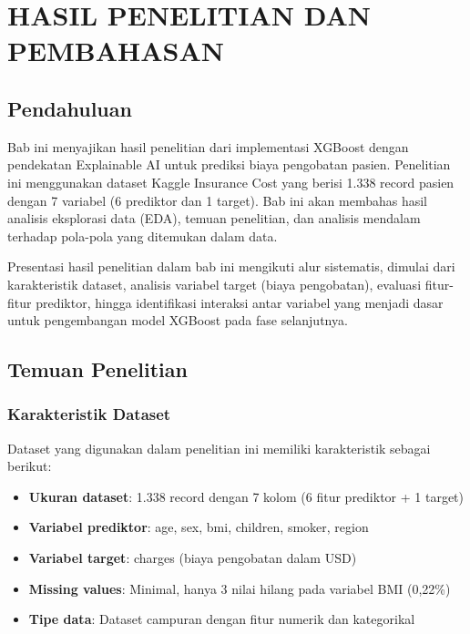 \chapter{HASIL PENELITIAN DAN PEMBAHASAN}
\label{chap:hasil}

\section{Pendahuluan}
\label{sec:pendahuluan-hasil}

Bab ini menyajikan hasil penelitian dari implementasi XGBoost dengan pendekatan Explainable AI untuk prediksi biaya pengobatan pasien. Penelitian ini menggunakan dataset Kaggle Insurance Cost yang berisi 1.338 record pasien dengan 7 variabel (6 prediktor dan 1 target). Bab ini akan membahas hasil analisis eksplorasi data (EDA), temuan penelitian, dan analisis mendalam terhadap pola-pola yang ditemukan dalam data.

Presentasi hasil penelitian dalam bab ini mengikuti alur sistematis, dimulai dari karakteristik dataset, analisis variabel target (biaya pengobatan), evaluasi fitur-fitur prediktor, hingga identifikasi interaksi antar variabel yang menjadi dasar untuk pengembangan model XGBoost pada fase selanjutnya.

\section{Temuan Penelitian}
\label{sec:temuan-penelitian}

\subsection{Karakteristik Dataset}
\label{subsec:karakteristik-dataset}

Dataset yang digunakan dalam penelitian ini memiliki karakteristik sebagai berikut:

\begin{itemize}
    \item \textbf{Ukuran dataset}: 1.338 record dengan 7 kolom (6 fitur prediktor + 1 target)
    \item \textbf{Variabel prediktor}: age, sex, bmi, children, smoker, region
    \item \textbf{Variabel target}: charges (biaya pengobatan dalam USD)
    \item \textbf{Missing values}: Minimal, hanya 3 nilai hilang pada variabel BMI (0,22\%)
    \item \textbf{Tipe data}: Dataset campuran dengan fitur numerik dan kategorikal
\end{itemize}

